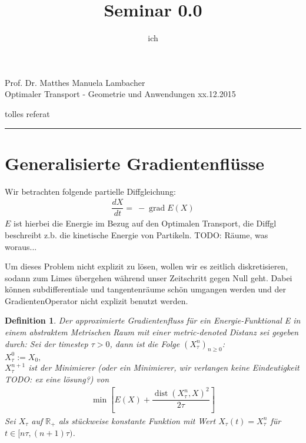 \documentclass[11pt,a4paper,notitlepage]{scrreprt}
\author{ich}
\title{Seminar 0.0}
\newcommand{\RR}{\mathbb{R}}
\newcommand{\dist}{\operatorname{dist}}
\newcommand{\grad}{\operatorname{grad}}
\newtheorem{defi}{Definition}[section]
\begin{document}
\parindent 0pt



\pagestyle{plain}



 Prof. Dr. Matthes \hfill Manuela Lambacher\\
 Optimaler Transport - Geometrie und Anwendungen \hfill xx.12.2015
 \begin{center}
  {\huge{tolles referat}} 
 \end{center}
 
 \hrule
 
\renewcommand{\thechapter}{\arabic{section}}
\renewcommand{\thesection}{\arabic{section}}
\section{Generalisierte Gradientenflüsse}

Wir betrachten folgende partielle Diffgleichung: 
\begin{eqnarray}
\dfrac{dX}{dt}=~-\grad E(X) \label{eq1}
\end{eqnarray}
$E$ ist hierbei die Energie im Bezug auf den Optimalen Transport, die Diffgl beschreibt z.b. die kinetische Energie von Partikeln. 
TODO: Räume, was woraus... 
\newline

Um dieses Problem nicht explizit zu lösen, wollen wir es zeitlich diskretisieren, sodann zum Limes übergehen während unser Zeitschritt gegen Null geht. Dabei können subdifferentiale und tangentenräume schön umgangen werden und der GradientenOperator nicht explizit benutzt werden.

\begin{defi}
Der approximierte Gradientenfluss für ein Energie-Funktional E in einem abstraktem Metrischen Raum mit einer metric-denoted Distanz sei gegeben durch:
\newline
Sei der timestep $\tau > 0$, dann ist die Folge $\left( X^n_\tau \right)_{n\geq 0}$:
\\
$X_\tau^0:=X_0,$
\\
$X_\tau^{n+1}$ ist der Minimierer (oder ein Minimierer, wir verlangen keine Eindeutigkeit TODO: ex eine lösung?) von 
\begin{eqnarray}
\min\left[E(X)+\dfrac{\dist(X_\tau^n,X)^2}{2\tau}\right] \label{Min}
\end{eqnarray}
Sei $X_\tau$ auf $\RR_+$ als stückweise konstante Funktion mit Wert $X_\tau(t)=X^n_\tau$ für $t\in [n\tau,(n+1)\tau)$.
\end{defi}
\end{document}
